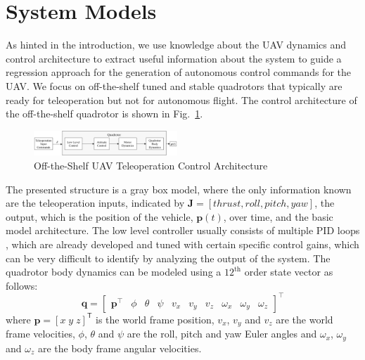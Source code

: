 \documentclass[letterpaper, 10 pt, conference]{ieeeconf}  %
\newcommand\NB[1]{$\spadesuit$\footnote{NB: #1}}
\begin{document}
\section{System Models} \label{sec:sysdyn}
As hinted in the introduction, we use knowledge about the UAV dynamics and control architecture to extract useful information about the system to guide a regression approach for the generation of autonomous control commands for the UAV. We focus on off-the-shelf tuned and stable quadrotors that typically are ready for teleoperation but not for autonomous flight. The control architecture of the off-the-shelf quadrotor is shown in Fig.~\ref{fig:otsctrl}.
\begin{figure}[ht]
    \includegraphics[width=0.48\textwidth]{images/ctrler2.png}
    \caption{Off-the-Shelf UAV Teleoperation Control Architecture}
    \label{fig:otsctrl}
\end{figure}
The presented structure is a gray box model, where the only information known are the teleoperation inputs, indicated by $\bm{J}=\left[thrust, roll, pitch, yaw\right]$, the output, which is the position of the vehicle, $\bm{p}(t)$, over time, and the basic model architecture. The low level controller usually consists of multiple PID loops \cite{esen}, which are already developed and tuned with certain specific control gains, which can be very difficult to identify by analyzing the output of the system. The quadrotor body dynamics can be modeled using a $12^{\text{th}}$ order state vector as follows:
\begin{equation}
    \bm{q} = 
    \begin{bmatrix}
    \bm{p}^\intercal & \phi & \theta & \psi & v_x & v_y & v_z & \omega_x & \omega_y & \omega_z
    \end{bmatrix}^\intercal \nonumber
\end{equation} 
where $\bm{p}=[x \; y \; z]^{\mathsf{T}}$ is the world frame position, $v_{x}$, $v_{y}$ and $v_z$ are the world frame velocities, $\phi$, $\theta$ and $\psi$ are the roll, pitch and yaw Euler angles and $\omega_{x}$, $\omega_{y}$ and $\omega_{z}$ are the body frame angular velocities.
\end{document}
